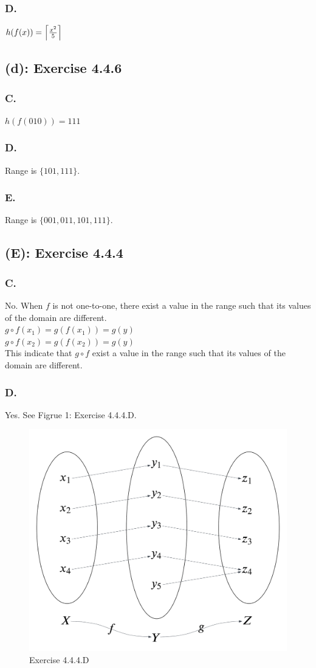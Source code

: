 \documentclass[titlepage]{article}\pagestyle{empty}
\DeclarePairedDelimiter\ceil{\lceil}{\rceil}
\begin{document}
\subsubsection*{D.} 
$h(f(x))=\ceil*{\frac{x^2}{5}}$
\subsection*{(d): Exercise 4.4.6}
\subsubsection*{C.} $h(f(010))=111$
\subsubsection*{D.} Range is $\{101, 111\}$.
\subsubsection*{E.} Range is $\{001, 011, 101, 111\}$.

\subsection*{(E): Exercise 4.4.4}
\subsubsection*{C.}
No.
When $f$ is not one-to-one, there exist a value in the range such that its values of the domain are different.\\
$g \circ f(x_1) = g(f(x_1)) = g(y)$\\
$g \circ f(x_2) = g(f(x_2)) = g(y)$\\
This indicate that $g \circ f$ exist a value in the range such that its values of the domain are different.\\
\subsubsection*{D.}
Yes.
See Figrue 1: Exercise 4.4.4.D.
\begin{figure}
    \centering
    \includegraphics[width=1\linewidth]{Exercise 4.4.6.D.png}
    \caption{Exercise 4.4.4.D}
    \label{fig:enter-label}
\end{figure}
\end{document}
